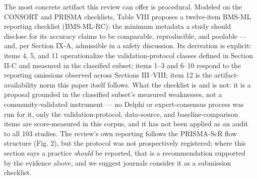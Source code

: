 \documentclass[journal]{IEEEtran}
\begin{document}
The most concrete artifact this review can offer is procedural. Modeled on the CONSORT and PRISMA checklists, Table VIII proposes a twelve-item BMS-ML reporting checklist (BMS-ML-RC): the minimum metadata a study should disclose for its accuracy claims to be comparable, reproducible, and poolable --- and, per Section IX-A, admissible in a safety discussion. Its derivation is explicit: items 4, 5, and 11 operationalize the validation-protocol classes defined in Section II-C and measured in the classified subset; items 1--3 and 6--10 respond to the reporting omissions observed across Sections III--VIII; item 12 is the artifact-availability norm this paper itself follows. What the checklist is and is not: it is a proposal grounded in the classified subset's measured weaknesses, not a community-validated instrument --- no Delphi or expert-consensus process was run for it, only the validation-protocol, data-source, and baseline-comparison items are score-measured in this corpus, and it has not been applied as an audit to all 103 studies. The review's own reporting follows the PRISMA-ScR flow structure (Fig. 2), but the protocol was not prospectively registered; where this section says a practice \textit{should} be reported, that is a recommendation supported by the evidence above, and we suggest journals consider it as a submission checklist.
\end{document}
